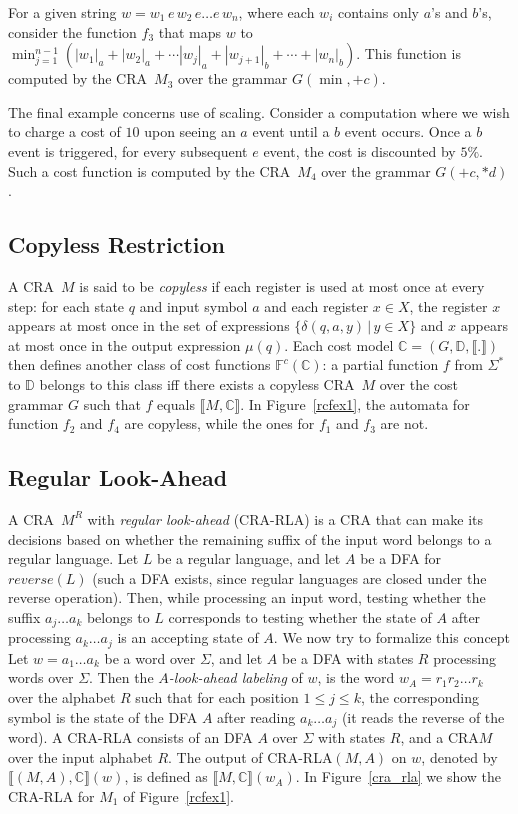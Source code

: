 \documentclass[11pt]{article}
\newcommand{\mypar}[1]{\subsection{#1}}
\newcommand{\domain}{\ensuremath{\mathbb{D}}}
\newcommand{\CG}{G}
\newcommand{\CCF}{{\mathbb F}^c}
\newcommand{\sep}{\ensuremath{\,|\,}}
\newcommand{\CostModel}{\ensuremath{\mathbb{C}}}
\newcommand{\inputalph}{\ensuremath{\Sigma}}
\newcommand{\fm}[1]{\ensuremath{#1^{*}}}
\newcommand{\interp}[1]{\ensuremath{\llbracket #1\rrbracket}}
\newcommand{\computation}[1]{\ensuremath{\llbracket #1\rrbracket}}
\newcommand{\EDWA}{{CRA}\xspace}
\newcommand{\REDWA}{{CRA}-{RLA}\xspace}
\newcommand{\edwa}{\ensuremath{M}}
\newcommand{\edwastate}{\ensuremath{q}}
\newcommand{\edwatrans}{\ensuremath{\delta}}
\newcommand{\edwafinal}{\ensuremath{\mu}}
\begin{document}
For a given string $w=w_1\,e\, w_2\, e \ldots e\, w_n$, where each
$w_i$ contains only $a$'s and $b$'s, consider the function $f_3$ that
maps $w$ to $\min_{j=1}^{n-1} (|w_1|_a + |w_2|_a + \cdots |w_j|_a +
|w_{j+1}|_b + \cdots + |w_n|_b)$.  This function is computed by the
\EDWA\ $\edwa_3$ over the grammar $\CG(\min,+c)$.

The final example concerns use of scaling. Consider a computation
where we wish to charge a cost of $10$ upon seeing an $a$ event until
a $b$ event occurs.  Once a $b$ event is triggered, for every
subsequent $e$ event, the cost is discounted by $5\%$. Such a cost
function is computed by the \EDWA\ $\edwa_4$ over the grammar
$\CG(+c,*d)$.

\mypar{Copyless Restriction}
A \EDWA\ $\edwa$ is said to be {\em copyless\/} if each register is
used at most once at every step: for each state $\edwastate$ and input
symbol $a$ and each register $x\in X$, the register $x$ appears at
most once in the set of expressions $\{\edwatrans(\edwastate,a,y)\sep
y \in X\}$ and $x$ appears at most once in the output expression
$\edwafinal(\edwastate)$.  Each cost model $\CostModel=(\CG, \domain,
\interp{.})$ then defines another class of cost functions
$\CCF(\CostModel)$: a partial function $f$ from $\fm\inputalph$ to
$\domain$ belongs to this class iff there exists a copyless \EDWA\
$\edwa$ over the cost grammar $\CG$ such that $f$ equals
$\computation{\edwa,\CostModel}$.  In Figure~\ref{rcfex1}, the
automata for function $f_2$ and $f_4$ are copyless, while the ones for
$f_1$ and $f_3$ are not.

\mypar{Regular Look-Ahead}\label{subsec:rla}
A \EDWA\ $\edwa^R$ with {\em regular look-ahead} (\REDWA) is a
\EDWA\xspace that can make its decisions based on whether the
remaining suffix of the input word belongs to a regular language.  Let
$L$ be a regular language, and let $A$ be a DFA for $reverse(L)$ (such
a DFA exists, since regular languages are closed under the reverse
operation). Then, while processing an input word, testing whether the
suffix $a_j\ldots a_k$ belongs to $L$ corresponds to testing whether
the state of $A$ after processing $a_k\ldots a_j$ is an accepting
state of $A$.  We now try to formalize this concept Let $w = a_1\ldots
a_k$ be a word over $\Sigma$, and let $A$ be a DFA with states $R$
processing words over $\Sigma$. Then the \emph{$A$-look-ahead labeling} of
$w$, is the word $w_A = r_1r_2\ldots r_k$ over the alphabet $R$ such
that for each position $1 \leq j \leq k$, the corresponding symbol is
the state of the DFA $A$ after reading $a_k\ldots a_j$ (it reads the
reverse of the word).  A \REDWA consists of an DFA $A$ over
$\Sigma$ with states $R$, and a \EDWA $\edwa$ over the input
alphabet $R$.  The output of \REDWA $(\edwa,A)$ on $w$, denoted by
$\computation{(\edwa,A),\CostModel}(w)$, is defined as
$\computation{\edwa,\CostModel}(w_A)$.  In Figure~\ref{cra_rla} we
show the \REDWA for $M_1$ of Figure~\ref{rcfex1}.
\end{document}
